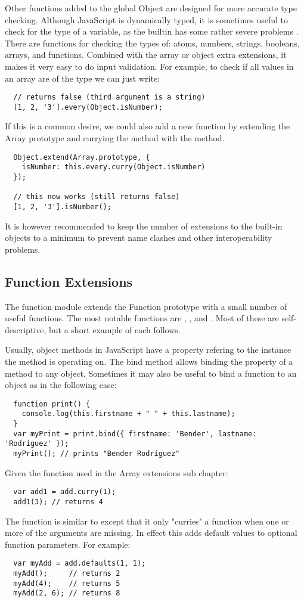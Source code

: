 Other functions added to the global Object are designed for more accurate type checking. Although JavaScript is dynamically typed, it is sometimes useful to check for the type of a variable, as the builtin  has some rather severe problems \cite{typeof}. There are functions for checking the types of: atoms, numbers, strings, booleans, arrays, and functions. Combined with the array or object extra extensions, it makes it very easy to do input validation. For example, to check if all values in an array are of the type  we can just write:
\begin{verbatim}
  // returns false (third argument is a string)
  [1, 2, '3'].every(Object.isNumber);
\end{verbatim}
If this is a common desire, we could also add a new function by extending the Array prototype and currying the  method with the  method.
\begin{verbatim}
  Object.extend(Array.prototype, {
    isNumber: this.every.curry(Object.isNumber)
  });

  // this now works (still returns false)
  [1, 2, '3'].isNumber();
\end{verbatim}
It is however recommended to keep the number of extensions to the built-in objects to a minimum to prevent name clashes and other interoperability problems.

\subsection{Function Extensions}
The function module extends the Function prototype with a small number of useful functions. The most notable functions are , , and . Most of these are self-descriptive, but a short example of each follows.

Usually, object methods in JavaScript have a  property refering to the instance the method is operating on. The bind method allows binding the  property of a method to any object. Sometimes it may also be useful to bind a function to an object as in the following case:
\begin{verbatim}
  function print() {
    console.log(this.firstname + " " + this.lastname);
  }
  var myPrint = print.bind({ firstname: 'Bender', lastname: 'Rodríguez' });
  myPrint(); // prints "Bender Rodríguez"
\end{verbatim}
Given the  function used in the Array extensions sub chapter:
\begin{verbatim}
  var add1 = add.curry(1);
  add1(3); // returns 4
\end{verbatim}
The  function is similar to  except that it only "curries" a function when one or more of the arguments are missing. In effect this adds default values to optional function parameters. For example:
\begin{verbatim}
  var myAdd = add.defaults(1, 1);
  myAdd();     // returns 2
  myAdd(4);    // returns 5
  myAdd(2, 6); // returns 8
\end{verbatim}

